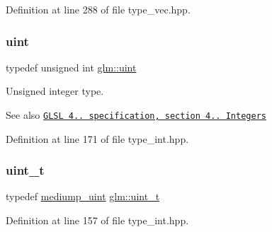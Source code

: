 Definition at line 288 of file type\+\_\+vec.\+hpp.

\mbox{\label{group__core__precision_ga4fd29415871152bfb5abd588334147c8}} 
\subsubsection{\texorpdfstring{uint}{uint}}
{\footnotesize\ttfamily typedef unsigned int \hyperlink{group__core__precision_ga4fd29415871152bfb5abd588334147c8}{glm\+::uint}}

Unsigned integer type.

\begin{DoxySeeAlso}{See also}
\href{http://www.opengl.org/registry/doc/GLSLangSpec.4.20.8.pdf}{\tt G\+L\+SL 4.. specification, section 4.. Integers} 
\end{DoxySeeAlso}


Definition at line 171 of file type\+\_\+int.\+hpp.

\mbox{\label{group__core__precision_ga5f2ae871c284c9d39ae8fdbb1305b566}} 
\subsubsection{\texorpdfstring{uint\+\_\+t}{uint\_t}}
{\footnotesize\ttfamily typedef \hyperlink{group__core__precision_ga08ae38ad78ade3539fdd1d25052b8c51}{mediump\+\_\+uint} \hyperlink{group__core__precision_ga5f2ae871c284c9d39ae8fdbb1305b566}{glm\+::uint\+\_\+t}}



Definition at line 157 of file type\+\_\+int.\+hpp.

